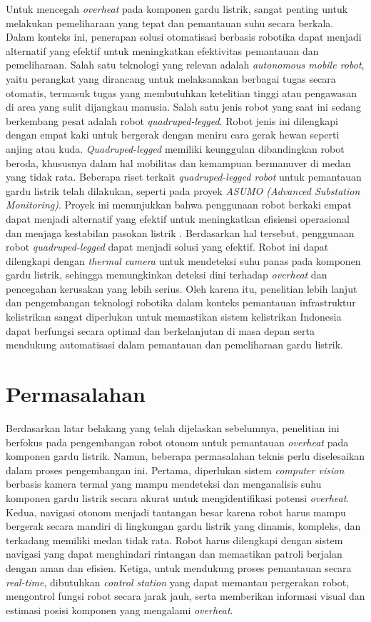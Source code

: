 Untuk mencegah \emph{overheat} pada komponen gardu listrik, sangat penting untuk melakukan pemeliharaan yang tepat dan pemantauan suhu secara berkala. Dalam konteks ini, penerapan solusi otomatisasi berbasis robotika dapat menjadi alternatif yang efektif untuk meningkatkan efektivitas pemantauan dan pemeliharaan. Salah satu teknologi yang relevan adalah \emph{autonomous mobile robot}, yaitu perangkat yang dirancang untuk melaksanakan berbagai tugas secara otomatis, termasuk tugas yang membutuhkan ketelitian tinggi atau pengawasan di area yang sulit dijangkau manusia. Salah satu jenis robot yang saat ini sedang berkembang pesat adalah robot \emph{quadruped-legged}. Robot jenis ini dilengkapi dengan empat kaki untuk bergerak dengan meniru cara gerak hewan seperti anjing atau kuda. \emph{Quadruped-legged} memiliki keunggulan dibandingkan robot beroda, khususnya dalam hal mobilitas dan kemampuan bermanuver di medan yang tidak rata. Beberapa riset terkait \emph{quadruped-legged robot} untuk pemantauan gardu listrik telah dilakukan, seperti pada proyek \emph{ASUMO (Advanced Substation Monitoring)}. Proyek ini menunjukkan bahwa penggunaan robot berkaki empat dapat menjadi alternatif yang efektif untuk meningkatkan efisiensi operasional dan menjaga kestabilan pasokan listrik \cite{ASUMO2023}.  Berdasarkan hal tersebut, penggunaan robot \emph{quadruped-legged} dapat menjadi solusi yang efektif. Robot ini dapat dilengkapi dengan \emph{thermal camera} untuk mendeteksi suhu panas pada komponen gardu listrik, sehingga memungkinkan deteksi dini terhadap \emph{overheat} dan pencegahan kerusakan yang lebih serius. Oleh karena itu, penelitian lebih lanjut dan pengembangan teknologi robotika dalam konteks pemantauan infrastruktur kelistrikan sangat diperlukan untuk memastikan sistem kelistrikan Indonesia dapat berfungsi secara optimal dan berkelanjutan di masa depan serta mendukung automatisasi dalam pemantauan dan pemeliharaan gardu listrik.

\section{Permasalahan}
Berdasarkan latar belakang yang telah dijelaskan sebelumnya, penelitian ini berfokus pada pengembangan robot otonom untuk pemantauan \emph{overheat} pada komponen gardu listrik. Namun, beberapa permasalahan teknis perlu diselesaikan dalam proses pengembangan ini. Pertama, diperlukan sistem \emph{computer vision} berbasis kamera termal yang mampu mendeteksi dan menganalisis suhu komponen gardu listrik secara akurat untuk mengidentifikasi potensi \emph{overheat}. Kedua, navigasi otonom menjadi tantangan besar karena robot harus mampu bergerak secara mandiri di lingkungan gardu listrik yang dinamis, kompleks, dan terkadang memiliki medan tidak rata. Robot harus dilengkapi dengan sistem navigasi yang dapat menghindari rintangan dan memastikan patroli berjalan dengan aman dan efisien. Ketiga, untuk mendukung proses pemantauan secara \emph{real-time}, dibutuhkan \emph{control station} yang dapat memantau pergerakan robot, mengontrol fungsi robot secara jarak jauh, serta memberikan informasi visual dan estimasi posisi komponen yang mengalami \emph{overheat}.

